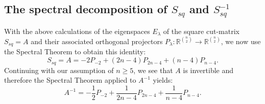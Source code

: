\documentclass[12pt]{amsart}
\numberwithin{theorem}{section}
\theoremstyle{remark}
\begin{document}
\subsection{The spectral decomposition of $S_{sq}$ and $S_{sq}^{-1}$} \label{Section on the spectral decomposition of the square cut-matrix}
With the above calculations of the eigenspaces $E_\lambda$ of the square cut-matrix $S_{sq} = A$ and their associated orthogonal projectors $P_\lambda :\mathbb R^{n\choose 2} \to \mathbb R^{n\choose 2}$, we now use the Spectral Theorem to obtain this identity: 
$$S_{sq} = A = -2P_{-2}+ (2n-4) P_{2n-4}+ (n-4)P_{n-4}.$$
Continuing with our assumption of $n\ge 5$, we see that $A$ is invertible and therefore the Spectral Theorem applied to $A^{-1}$ yields: 
%
\begin{equation} \label{First expression for the invers of the square cut matrix}
A^{-1} = -\frac{1}{2}P_{-2} + \frac{1}{2n-4}P_{2n-4}+\frac{1}{n-4}P_{n-4}.
\end{equation} 
%
%
%
\end{document}
